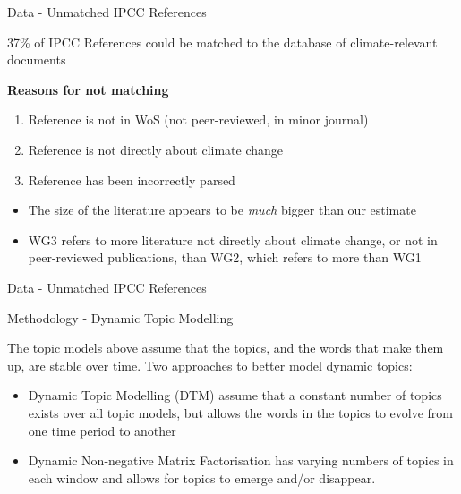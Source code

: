 \documentclass[9pt]{beamer}
\begin{document}
\begin{frame}{Data - Unmatched IPCC References}

37\% of IPCC References could be matched to the database of climate-relevant documents

\medskip

\textbf{Reasons for not matching}
\begin{enumerate}
\item<2->Reference is not in WoS (not peer-reviewed, in minor journal)
\item<3->Reference is not directly about climate change
\item<4->Reference has been incorrectly parsed
\end{enumerate}

\medskip

\begin{itemize}
\item<5-> The size of the literature appears to be \textit{much} bigger than our estimate
\item<6-> WG3 refers to more literature not directly about climate change, or not in peer-reviewed publications, than WG2, which refers to more than WG1
\end{itemize}

\end{frame}

\begin{frame}{Data - Unmatched IPCC References}
\tiny

\end{frame}

\begin{frame}{Methodology - Dynamic Topic Modelling}

The topic models above assume that the topics, and the words that make them up, are stable over time. Two approaches to better model dynamic topics:

\begin{itemize}
\item<2->Dynamic Topic Modelling (DTM) \citep{Blei2006} assume that a constant number of topics exists over all topic models, but allows the words in the topics to evolve from one time period to another
\item<3->Dynamic Non-negative Matrix Factorisation \citep{Greene2016} has varying numbers of topics in each window and allows for topics to emerge and/or disappear.
\end{itemize}


\end{frame}
\end{document}

